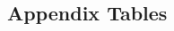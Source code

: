 \documentclass{article}
\begin{document}
\begin{spacing}{1.1}
\section{Appendix Tables}


\end{spacing}
\end{document}
